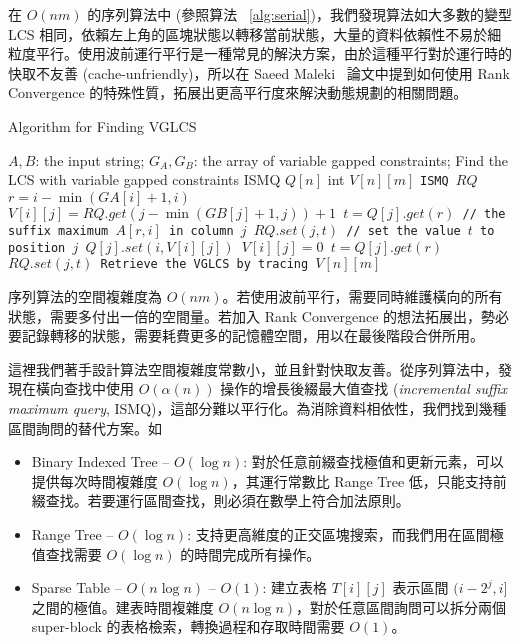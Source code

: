 \documentclass{gapd}
\begin{document}
在 $O(nm)$ 的序列算法中 (參照算法 ~\ref{alg:serial})，我們發現算法如大多數的變型 LCS 相同，依賴左上角的區塊狀態以轉移當前狀態，大量的資料依賴性不易於細粒度平行。使用波前運行平行是一種常見的解決方案，由於這種平行對於運行時的快取不友善 (cache-unfriendly)，所以在 Saeed Maleki~\cite{saeed} 論文中提到如何使用 Rank Convergence 的特殊性質，拓展出更高平行度來解決動態規劃的相關問題。

\begin{algorithm*}[!thb]
  \caption{Algorithm for Finding VGLCS}
  \label{alg:serial}
  \begin{algorithmic}[1]
    \Require
      $A, B$: the input string;
      $G_A, G_B$: the array of variable gapped constraints;
    \Ensure Find the LCS with variable gapped constraints
    \State ISMQ $Q[n]$
    \State int $V[n][m]$
      \State \tt{ISMQ} $RQ$
      \State $r = i - \min(GA[i]+1, i)$
            \State $V[i][j] = RQ.get(j - \min(GB[j]+1, j))+1$
            \State $t = Q[j].get(r)$ // the suffix maximum $A[r, i]$ in column $j$
            \State $RQ.set(j, t)$ // set the value $t$ to position $j$
            \State $Q[j].set(i, V[i][j])$
        \Else
            \State $V[i][j] = 0$
            \State $t = Q[j].get(r)$
            \State $RQ.set(j, t)$
        \EndIf
      \EndFor
    \EndFor
    \State Retrieve the VGLCS by tracing $V[n][m]$
  \end{algorithmic}
\end{algorithm*}

序列算法的空間複雜度為 $O(nm)$。若使用波前平行，需要同時維護橫向的所有狀態，需要多付出一倍的空間量。若加入 Rank Convergence 的想法拓展出，勢必要記錄轉移的狀態，需要耗費更多的記憶體空間，用以在最後階段合併所用。

這裡我們著手設計算法空間複雜度常數小，並且針對快取友善。從序列算法中，發現在橫向查找中使用 $O(\alpha(n))$ 操作的增長後綴最大值查找 (\emph{incremental suffix maximum query}, ISMQ)，這部分難以平行化。為消除資料相依性，我們找到幾種區間詢問的替代方案。如 

\begin{itemize}
  \item Binary Indexed Tree -- $O(\log n)$: 對於任意前綴查找極值和更新元素，可以提供每次時間複雜度 $O(\log n)$，其運行常數比 Range Tree 低，只能支持前綴查找。若要運行區間查找，則必須在數學上符合加法原則。
  \item Range Tree -- $O(\log n)$: 支持更高維度的正交區塊搜索，而我們用在區間極值查找需要 $O(\log n)$ 的時間完成所有操作。
  \item Sparse Table -- $O(n \log n)$ -- $O(1)$:
    建立表格 $T[i][j]$ 表示區間 $(i-2^j,i]$ 之間的極值。建表時間複雜度 $O(n \log n)$，對於任意區間詢問可以拆分兩個 super-block 的表格檢索，轉換過程和存取時間需要 $O(1)$。
\end{itemize}
\end{document}
